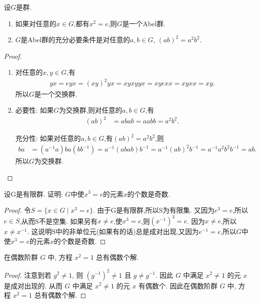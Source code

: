 \documentclass[../../main.tex]{subfiles}%
\begin{document}
\begin{proposition}
设$G$是群. 
\begin{enumerate}[(1)]
\item 如果对任意的$x \in G$,都有$x^2 = e$,则$G$是一个Abel群.

\item $G$是Abel群的充分必要条件是对任意的$a,b \in G$, $(ab)^2 = a^2 b^2$.
\end{enumerate}
\end{proposition}
\begin{proof}
\begin{enumerate}[(1)]
\item 对任意的$x,y \in G$,有
\begin{align*}
yx = eyx = (xy)^2 yx = xyxyyx = xyexx = xyxx = xy.
\end{align*}
所以$G$是一个交换群.

\item {\heiti 必要性:} 如果$G$为交换群,则对任意的$a,b \in G$,有
\begin{align*}
(ab)^2 &= abab = aabb = a^2 b^2.
\end{align*}

{\heiti 充分性:} 如果对任意的$a,b \in G$,有$(ab)^2 = a^2 b^2$,则
\begin{align*}
ba &= (a^{-1}a)ba(bb^{-1}) = a^{-1}(abab)b^{-1} = a^{-1}(ab)^2 b^{-1} = a^{-1}a^2 b^2 b^{-1} = ab.
\end{align*}
所以$G$为交换群.
\end{enumerate}
\end{proof}

\begin{example}
设G是有限群. 证明: $G$中使$x^3 = e$的元素$x$的个数是奇数.
\end{example}
\begin{proof}
令$S = \{x \in G \mid x^3 = e\}$. 由于G是有限群,所以S为有限集. 又因为$e^3 = e$,所以$e \in S$,从而S不是空集. 如果另有$x \neq e$,使$x^3 = e$,则$(x^{-1})^3 = e$. 因为$x \neq e$,所以$x \neq x^{-1}$. 这说明S中的非单位元(如果有的话)总是成对出现,又因为$e^{-1} = e$,所以$G$中使$x^3 = e$的元素$x$的个数是奇数.
\end{proof}

\begin{example}
在偶数阶群 $G$ 中, 方程 $x^2=1$ 总有偶数个解.
\end{example}
\begin{proof}
注意到若 $g^2 \neq 1$, 则 $(g^{-1})^2 \neq 1$ 且 $g \neq g^{-1}$. 因此 $G$ 中满足 $x^2 \neq 1$ 的元 $x$ 是成对出现的. 从而 $G$ 中满足 $x^2 \neq 1$ 的元 $x$ 有偶数个. 因此在偶数阶群 $G$ 中, 方程 $x^2=1$ 总有偶数个解.
\end{proof}
\end{document}
